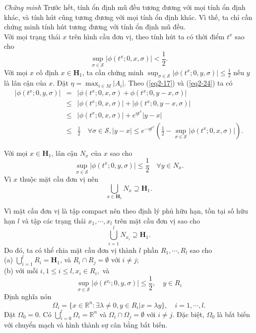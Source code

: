 \documentclass[14pt,a4paper,oneside]{report}		%
\begin{document}
\textit{Chứng minh} Trước hết, tính ổn định mũ đều tương đương với mọi tính ổn định khác, và tính hút cũng tương đương với mọi tính ổn định khác. Vì thế, ta chỉ cần chứng minh tính hút tương đương với tính ổn định mũ đều.\\

Với mọi trạng thái $x$ trên hình cầu đơn vị, theo tính hút ta có thời điểm $t^x$ sao cho
\begin{equation} \label{eq2-24}
\sup_{\sigma\in\mathcal{S}}|\phi(t^x;0,x,\sigma)|<\frac{1}{2}.
\end{equation}
Với mọi $x$ cố định $x\in\mathbf{H}_1$, ta cần chứng minh $\sup_{\sigma\in\mathcal{S}}|\phi(t^x;0,y,\sigma)|\leq\frac{1}{2}$ nếu $y$ là lân cận của $x$. Đặt $\eta = \max_{i\in M}|A_i|$. Theo (\ref{eq2-17}) và (\ref{eq2-24}) ta có
$$
\begin{array}{lcl}|\phi (t^x;0,y,\sigma)|&
=& |\phi(t^x;0,x,\sigma) + \phi(t^x;0,y-x,\sigma)|\\
&\leq & |\phi(t^x;0,x,\sigma)| + |\phi(t^x;0,y-x,\sigma)|\\
&\leq &|\phi(t^x;0,x,\sigma)| + e^{\eta t^x}|y-x|\\
&\leq &\frac{1}{2}\quad\forall\sigma\in\mathcal{S}, |y-x|\leq e^{-\eta t^x}(\frac{1}{2}-\sup_{\sigma\in\mathcal{S}}|\phi(t^x;0,x,\sigma)|).
\end{array}
$$

Với mọi $x\in\mathbf{H}_1$, lân cận $N_x$ của $x$ sao cho
$$\sup_{\sigma\in\mathcal{S}}|\phi (t^x;0,y,\sigma)| \leq\frac{1}{2}\quad\forall y\in N_x.$$
Vì $x$ thuộc mặt cầu đơn vị nên
$$\bigcup_{x\in\mathbf{H}_1}N_x \supseteq \mathbf{H}_1.$$

Vì mặt cầu đơn vị là tập compact nên theo định lý phủ hữu hạn, tồn tại số hữu hạn $l$ và tập các trạng thái $x_1,\cdots,x_l$ trên mặt cầu đơn vị sao cho 
$$\bigcup_{i=1}^lN_{x_i} \supseteq \mathbf{H}_1.$$
Do đó, ta có thể chia mặt cầu đơn vị thành $l$ phần $R_1,\cdots,R_l$ sao cho\\
(a) $\bigcup_{i=1}^lR_i=\mathbf{H}_1$, và $R_i\cap R_j=\emptyset$ với $i\neq j$;\\
(b) với mỗi $i, 1\leq i\leq l,x_i\in R_i,$ và
$$\sup_{\sigma\in\mathcal{S}}|\phi(t^{x_i};0,y,\sigma)|\leq\frac{1}{2}, \quad y\in R_i$$
Định nghĩa nón
$$\Omega_i = \{x\in\mathbb{R}^n:\exists\lambda\neq 0, y\in R_i | x=\lambda y\}, \quad i=1,\cdots,l.$$
Đặt $\Omega_0={0}$. Có $\bigcup_{i=0}^l\Omega_i=\mathbb{R}^n$ và $\Omega_i \cap \Omega_j = \emptyset$ với $i\neq j$. Đặc biệt, $\Omega_0$ là bất biến với chuyển mạch và hình thành sự cân bằng bất biến.\\
\end{document}
